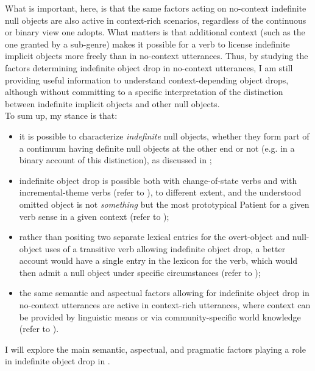What is important, here, is that the same factors acting on no-context indefinite null objects are also active in context-rich scenarios, regardless of the continuous or binary view one adopts. What matters is that additional context (such as the one granted by a sub-genre) makes it possible for a verb to license indefinite implicit objects more freely than in no-context utterances. Thus, by studying the factors determining indefinite object drop in no-context utterances, I am still providing useful information to understand context-depending object drops, although without committing to a specific interpretation of the distinction between indefinite implicit objects and other null objects.\\
To sum up, my stance is that:
\begin{itemize}
    \item it is possible to characterize \textit{indefinite} null objects, whether they form part of a continuum having definite null objects at the other end or not (e.g. in a binary account of this distinction), as discussed in ;
    \item indefinite object drop is possible both with change-of-state verbs and with incremental-theme verbs (refer to ), to different extent, and the understood omitted object is not \textit{something} but the most prototypical Patient for a given verb sense in a given context (refer to );
    \item rather than positing two separate lexical entries for the overt-object and null-object uses of a transitive verb allowing indefinite object drop, a better account would have a single entry in the lexicon for the verb, which would then admit a null object under specific circumstances (refer to );
    \item the same semantic and aspectual factors allowing for indefinite object drop in no-context utterances are active in context-rich utterances, where context can be provided by linguistic means or via community-specific world knowledge (refer to ).
\end{itemize}

I will explore the main semantic, aspectual, and pragmatic factors playing a role in indefinite object drop in .